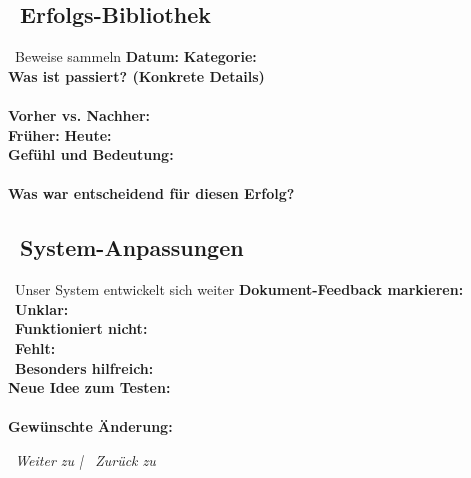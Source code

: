 \subsection*{\faTrophy~Erfolgs-Bibliothek}
\label{sec:erfolge}

\begin{ctmmGreenBox}{\faBullseye~Beweise sammeln}
\textbf{Datum:}  \quad \textbf{Kategorie:}   \\[0.3cm]

\textbf{Was ist passiert? (Konkrete Details)}\\
\\[0.3cm]

\textbf{Vorher vs. Nachher:}\\
\textbf{Früher:}  \textbf{Heute:} \\[0.3cm]

\textbf{Gefühl und Bedeutung:}\\
\\[0.3cm]

\textbf{Was war entscheidend für diesen Erfolg?}\\
\end{ctmmGreenBox}

\subsection*{\faLightbulb~System-Anpassungen}

\begin{ctmmOrangeBox}{\faWrench~Unser System entwickelt sich weiter}
\textbf{Dokument-Feedback markieren:}\\
\faThumbtack~\textbf{Unklar:} \\
\faTimes~\textbf{Funktioniert nicht:} \\
\faPlus~\textbf{Fehlt:} \\
\faStar~\textbf{Besonders hilfreich:} \\[0.3cm]

\textbf{Neue Idee zum Testen:}\\
\\[0.3cm]

\textbf{Gewünschte Änderung:}\\
\end{ctmmOrangeBox}

\vspace{1cm}
\begin{center}
\textit{\textcolor{ctmmGreen}{\faChevronRight~Weiter zu}  | \textcolor{ctmmBlue}{\faHome~Zurück zu} }
\end{center}
